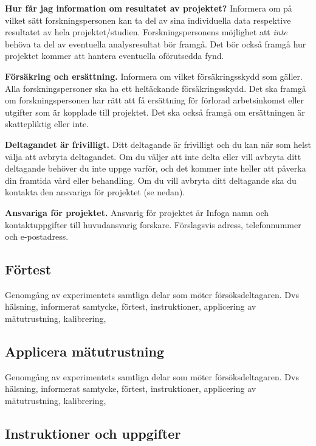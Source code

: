 \documentclass[
]{book}
\begin{document}
\textbf{Hur får jag information om resultatet av projektet?} Informera om på vilket sätt forskningspersonen kan ta del av sina individuella data respektive resultatet av hela projektet/studien. Forskningspersonens möjlighet att \emph{inte} behöva ta del av eventuella analysresultat bör framgå. Det bör också framgå hur projektet kommer att hantera eventuella oförutsedda fynd.

\textbf{Försäkring och ersättning.} Informera om vilket försäkringsskydd som gäller. Alla forskningspersoner ska ha ett heltäckande försäkringsskydd. Det ska framgå om forskningspersonen har rätt att få ersättning för förlorad arbetsinkomst eller utgifter som är kopplade till projektet. Det ska också framgå om ersättningen är skattepliktig eller inte.

\textbf{Deltagandet är frivilligt.} Ditt deltagande är frivilligt och du kan när som helst välja att avbryta deltagandet. Om du väljer att inte delta eller vill avbryta ditt deltagande behöver du inte uppge varför, och det kommer inte heller att påverka din framtida vård eller behandling. Om du vill avbryta ditt deltagande ska du kontakta den ansvariga för projektet (se nedan).

\textbf{Ansvariga för projektet.} Ansvarig för projektet är Infoga namn och kontaktuppgifter till huvudansvarig forskare. Förslagsvis adress, telefonnummer och e-postadress.

\hypertarget{sub07.6.3}{%
\subsection{Förtest}\label{sub07.6.3}}

Genomgång av experimentets samtliga delar som möter försöksdeltagaren. Dvs hälsning, informerat samtycke, förtest, instruktioner, applicering av mätutrustning, kalibrering,

\hypertarget{sub07.6.4}{%
\subsection{Applicera mätutrustning}\label{sub07.6.4}}

Genomgång av experimentets samtliga delar som möter försöksdeltagaren. Dvs hälsning, informerat samtycke, förtest, instruktioner, applicering av mätutrustning, kalibrering,

\hypertarget{sub07.6.5}{%
\subsection{Instruktioner och uppgifter}\label{sub07.6.5}}
\end{document}
